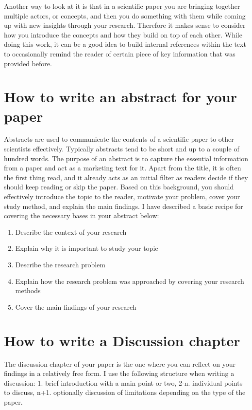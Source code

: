 Another way to look at it is that in a scientific paper you are bringing together multiple actors, or concepts, and then you do something with them while coming up with new insights through your research.
Therefore it makes sense to consider how you introduce the concepts and how they build on top of each other.
While doing this work, it can be a good idea to build internal references within the text to occasionally remind the reader of certain piece of key information that was provided before.

\section{How to write an abstract for your paper}

Abstracts are used to communicate the contents of a scientific paper to other scientists effectively.
Typically abstracts tend to be short and up to a couple of hundred words.
The purpose of an abstract is to capture the essential information from a paper and act as a marketing text for it.
Apart from the title, it is often the first thing read, and it already acts as an initial filter as readers decide if they should keep reading or skip the paper.
Based on this background, you should effectively introduce the topic to the reader, motivate your problem, cover your study method, and explain the main findings.
I have described a basic recipe for covering the necessary bases in your abstract below:

\begin{enumerate}
    \item Describe the context of your research
    \item Explain why it is important to study your topic
    \item Describe the research problem
    \item Explain how the research problem was approached by covering your research methods
    \item Cover the main findings of your research
\end{enumerate}


\section{How to write a Discussion chapter}

The discussion chapter of your paper is the one where you can reflect on your findings in a relatively free form.
I use the following structure when writing a discussion: 1. brief introduction with a main point or two, 2-n. individual points to discuss, n+1. optionally discussion of limitations depending on the type of the paper.


